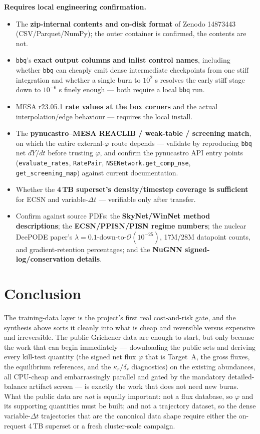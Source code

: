 \documentclass[11pt]{article}
\newcommand{\bbq}{\texttt{bbq}}
\begin{document}
\textbf{Requires local engineering confirmation.}

\begin{itemize}
\item The \textbf{zip-internal contents and on-disk format} of Zenodo 14873443 (CSV/Parquet/NumPy); the outer container is confirmed, the contents are not.
\item \bbq{}'s \textbf{exact output columns and inlist control names}, including whether \bbq{} can cheaply emit dense intermediate checkpoints from one stiff integration and whether a single burn to $10^2$ s resolves the early stiff stage down to $10^{-6}$ s finely enough --- both require a local \bbq{} run.
\item MESA r23.05.1 \textbf{rate values at the box corners} and the actual interpolation/edge behaviour --- requires the local install.
\item The \textbf{pynucastro--MESA REACLIB / weak-table / screening match}, on which the entire external-$\varphi$ route depends --- validate by reproducing \bbq{} net $dY/dt$ before trusting $\varphi$, and confirm the pynucastro API entry points (\texttt{evaluate\_\allowbreak rates}, \texttt{RatePair}, \texttt{NSENetwork.\allowbreak get\_\allowbreak comp\_\allowbreak nse}, \texttt{get\_\allowbreak screening\_\allowbreak map}) against current documentation.
\item Whether the \textbf{4\,TB superset's density/timestep coverage is sufficient} for ECSN and variable-$\Delta t$ --- verifiable only after transfer.
\item Confirm against source PDFs: the \textbf{SkyNet/\allowbreak WinNet method descriptions}; the \textbf{ECSN/\allowbreak PPISN/\allowbreak PISN regime numbers}; the nuclear DeePODE paper's $\lambda = 0.1$-down-to-$\mathcal{O}(10^{-25})$, 17M/28M datapoint counts, and gradient-retention percentages; and the \textbf{NuGNN signed-log/conservation details}.
\end{itemize}

\section{Conclusion}

The training-data layer is the project's first real cost-and-risk gate, and the synthesis above sorts it cleanly into what is cheap and reversible versus expensive and irreversible. The public Grichener data are enough to start, but only because the work that can begin immediately --- downloading the public sets and deriving every kill-test quantity (the signed net flux $\varphi$ that is Target~A, the gross fluxes, the equilibrium references, and the $\kappa_r/\delta_r$ diagnostics) on the existing abundances, all CPU-cheap and embarrassingly parallel and gated by the mandatory detailed-balance artifact screen --- is exactly the work that does not need new burns. What the public data are \emph{not} is equally important: not a flux database, so $\varphi$ and its supporting quantities must be built; and not a trajectory dataset, so the dense variable-$\Delta t$ trajectories that are the canonical data shape require either the on-request 4\,TB superset or a fresh cluster-scale campaign.
\end{document}
